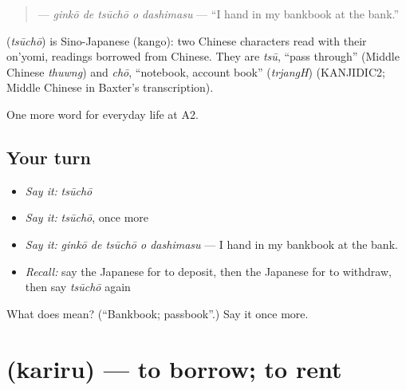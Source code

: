 \begin{quote}
\textbf{  } — \emph{ginkō de tsūchō o dashimasu} — \textquotedblleft{}I hand in my bankbook at the bank.\textquotedblright{}
\end{quote}

\begin{cousinweb}
\textbf{} (\emph{tsūchō}) is Sino-Japanese (kango): two Chinese characters read with their on'yomi, readings borrowed from Chinese. They are \emph{tsū}, \textquotedblleft{}pass through\textquotedblright{} (Middle Chinese \emph{thuwng}) and \emph{chō}, \textquotedblleft{}notebook, account book\textquotedblright{} (\emph{trjangH}) (KANJIDIC2; Middle Chinese in Baxter's transcription).
\end{cousinweb}

\begin{grammarlens}[title={What you've built}]
One more word for everyday life at A2.
\end{grammarlens}

\subsection*{Your turn}
\begin{itemize}
\raggedright
  \item \emph{Say it:} \emph{tsūchō}
  \item \emph{Say it:} \emph{tsūchō}, once more
  \item \emph{Say it:} \emph{ginkō de tsūchō o dashimasu} — I hand in my bankbook at the bank.
  \item \emph{Recall:} say the Japanese for to deposit, then the Japanese for to withdraw, then say \emph{tsūchō} again
\end{itemize}

\begin{tcolorbox}[breakable,colback=teal!4,colframe=teal!35!black,title={Before you move on}]
What does  mean? (\textquotedblleft{}Bankbook; passbook\textquotedblright{}.) Say it once more.
\end{tcolorbox}
\section[\texorpdfstring{\ja{かりる} (kariru)}{かりる (kariru)}]{ (kariru) — to borrow; to rent}

\label{lesson:JA-C187-kariru}



